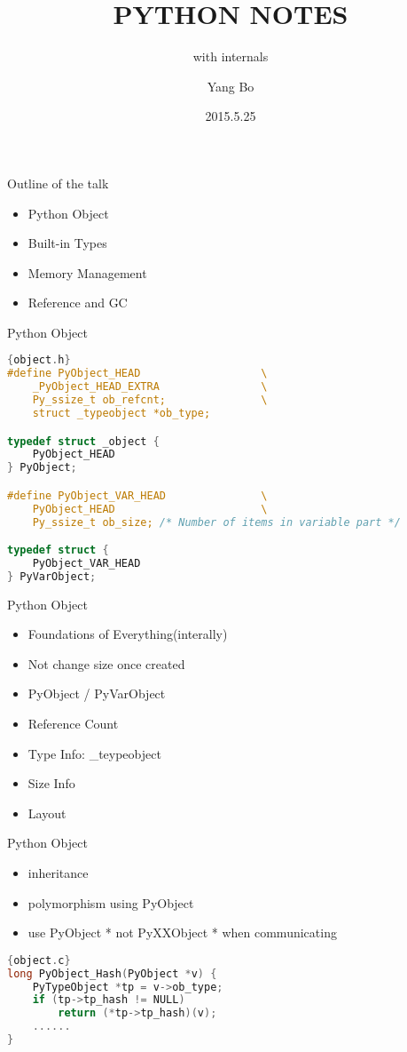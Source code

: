 \documentclass[xcolor=svgnames]{beamer}
\title{PYTHON NOTES}
\subtitle{with internals}
\author{Yang Bo}
\institute[Admaster]{
    RDBJ \\
    Admaster
}
\date{2015.5.25}
\begin{document}
\begin{frame}[plain]
  \titlepage
\end{frame}
\begin{frame}{Outline of the talk} 
 
\begin{itemize} 
  \item Python Object
  \item Built-in Types 
  \item Memory Management
  \item Reference and GC
\end{itemize} 
 
\end{frame} 

\begin{frame}[fragile]{Python Object}
    \begin{lstlisting}[language=C]{object.h}
#define PyObject_HEAD                   \
    _PyObject_HEAD_EXTRA                \
    Py_ssize_t ob_refcnt;               \
    struct _typeobject *ob_type;

typedef struct _object {
    PyObject_HEAD
} PyObject;

#define PyObject_VAR_HEAD               \
    PyObject_HEAD                       \
    Py_ssize_t ob_size; /* Number of items in variable part */

typedef struct {
    PyObject_VAR_HEAD
} PyVarObject;
\end{lstlisting} 
\end{frame}

\begin{frame}{Python Object}
  \begin{itemize}
    \item Foundations of Everything(interally)
    \item Not change size once created
    \item PyObject / PyVarObject
    \item Reference Count
    \item Type Info: \_teypeobject
    \item Size Info
    \item Layout
  \end{itemize}
\end{frame}

\begin{frame}[fragile]{Python Object}
  \begin{itemize}
    \item inheritance 
    \item polymorphism using PyObject
    \item use PyObject * not PyXXObject * when communicating
  \end{itemize}
\begin{lstlisting}[language=C]{object.c}
long PyObject_Hash(PyObject *v) {
    PyTypeObject *tp = v->ob_type;
    if (tp->tp_hash != NULL)
        return (*tp->tp_hash)(v);
    ......
}
\end{lstlisting} 
\end{frame}
\end{document}
